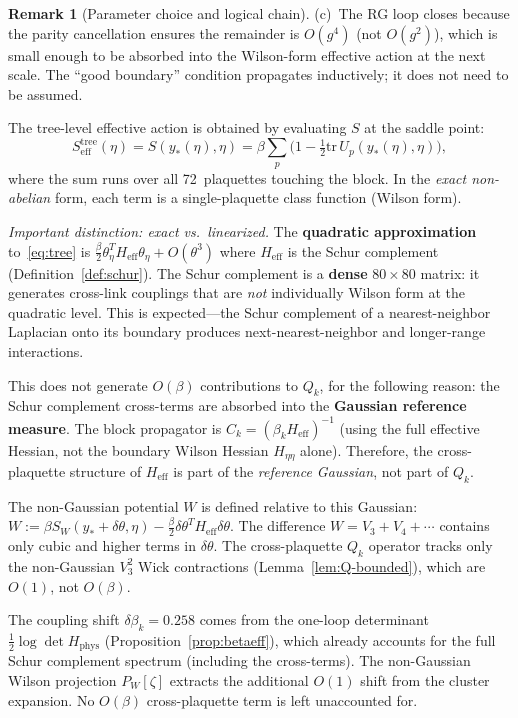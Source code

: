 \documentclass[11pt]{article}
\theoremstyle{definition}
\newtheorem{remark}[theorem]{Remark}
\newcommand{\tr}{\mathrm{tr}}
\begin{document}
\begin{remark}[Parameter choice and logical chain]
(c)~The RG loop closes because the parity cancellation
ensures the remainder is $O(g^4)$ (not $O(g^2)$), which is
small enough to be absorbed into the Wilson-form effective
action at the next scale.  The ``good boundary'' condition
propagates inductively; it does not need to be assumed.
\end{remark}

The tree-level effective action is obtained by evaluating $S$ at the
saddle point:
\begin{equation}\label{eq:tree}
S_{\mathrm{eff}}^{\mathrm{tree}}(\eta)
=S(y_*(\eta),\eta)
=\beta\sum_p\bigl(1-\tfrac{1}{2}\tr\,U_p(y_*(\eta),\eta)\bigr),
\end{equation}
where the sum runs over all 72~plaquettes touching the block.
In the \emph{exact non-abelian} form, each term is a
single-plaquette class function (Wilson form).

\emph{Important distinction: exact vs.\ linearized.}
The \textbf{quadratic approximation} to~\eqref{eq:tree} is
$\frac{\beta}{2}\theta_\eta^T H_{\mathrm{eff}}\theta_\eta
+O(\theta^3)$ where $H_{\mathrm{eff}}$ is the Schur complement
(Definition~\ref{def:schur}).  The Schur complement is a
\textbf{dense} $80\times 80$ matrix: it generates cross-link
couplings that are \emph{not} individually Wilson form at the
quadratic level.  This is expected---the Schur complement of
a nearest-neighbor Laplacian onto its boundary produces
next-nearest-neighbor and longer-range interactions.

This does not generate $O(\beta)$ contributions to
$Q_k$, for the following reason: the Schur complement
cross-terms are absorbed into the \textbf{Gaussian reference
measure}.  The block propagator is
$C_k=(\beta_k H_{\mathrm{eff}})^{-1}$ (using the full
effective Hessian, not the boundary Wilson Hessian $H_{\eta\eta}$
alone).  Therefore, the cross-plaquette structure of $H_{\mathrm{eff}}$
is part of the \emph{reference Gaussian}, not part of $Q_k$.

The non-Gaussian potential $W$ is defined relative to this
Gaussian: $W:=\beta S_W(y_*+\delta\theta,\eta)
-\frac{\beta}{2}\delta\theta^T H_{\mathrm{eff}}\delta\theta$.
The difference $W=V_3+V_4+\cdots$ contains only cubic and
higher terms in $\delta\theta$.  The cross-plaquette
$Q_k$ operator tracks only the non-Gaussian $V_3^2$
Wick contractions (Lemma~\ref{lem:Q-bounded}), which
are $O(1)$, not $O(\beta)$.

The coupling shift $\delta\beta_k=0.258$ comes from the
one-loop determinant $\frac{1}{2}\log\det H_{\mathrm{phys}}$
(Proposition~\ref{prop:betaeff}), which already accounts for
the full Schur complement spectrum (including the cross-terms).
The non-Gaussian Wilson projection $P_W[\zeta]$ extracts the
additional $O(1)$ shift from the cluster expansion.
No $O(\beta)$ cross-plaquette term is left unaccounted for.
\end{document}
